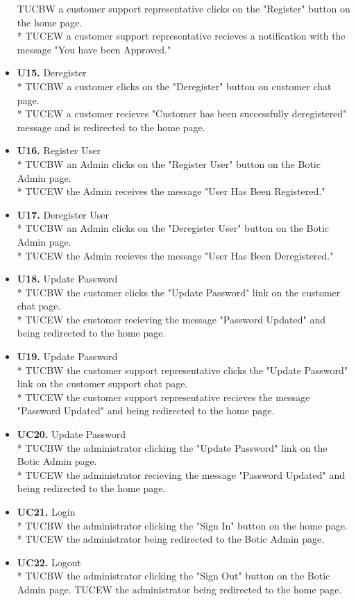 \documentclass[11pt]{article}
\begin{document}
\begin{itemize}
	TUCBW a customer support representative clicks on the "Register" button on the home page. \\*
	TUCEW a customer support representative recieves a notification with the message "You have been Approved."
	\item[] \textbf{U15.} Deregister\\*
	TUCBW a customer clicks on the "Deregister" button on customer chat page.\\*
	TUCEW a customer recieves "Customer has been successfully deregistered" message and is redirected to the home page.
	\item[] \textbf{U16.} Register User\\*
	TUCBW an Admin clicks on the "Register User" button on the Botic Admin page.\\*
	TUCEW the Admin receives the message "User Has Been Registered."
	\item[] \textbf{U17.} Deregister User\\*
	TUCBW an Admin clicks on the "Deregister User" button on the Botic Admin page.\\*
	TUCEW the Admin recieves the message "User Has Been Deregistered."
	\item[] \textbf{U18.} Update Password\\*
	TUCBW the customer clicks the "Update Password" link on the customer chat page.\\*
	TUCEW the customer recieving the message "Password Updated" and being redirected to the home page.
	\item[] \textbf{U19.} Update Password\\*
	TUCBW the customer support representative clicks the "Update Password" link on the customer support chat page.\\*
	TUCEW the customer support representative recieves the message "Password Updated" and being redirected to the home page. 
	\item[] \textbf{UC20.} Update Password \\*
	TUCBW the administrator clicking the "Update Password" link on the Botic Admin page.\\*
	TUCEW the administrator recieving the message "Password Updated" and being redirected to the home page.
	\item[] \textbf{UC21.} Login \\*
	TUCBW the administrator clicking the "Sign In" button on the home page. \\*
	TUCEW the administrator being redirected to the Botic Admin page.
	\item[] \textbf{UC22.} Logout \\*
	TUCBW the administrator clicking the "Sign Out" button on the Botic Admin page.
	TUCEW the administrator being redirected to the home page.
\end{itemize}
\end{document}
